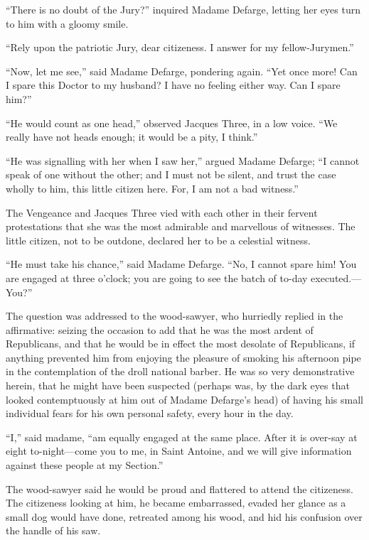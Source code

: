 ``There is no doubt of the Jury?'' inquired Madame Defarge, letting her
eyes turn to him with a gloomy smile.

``Rely upon the patriotic Jury, dear citizeness.  I answer for my
fellow-Jurymen.''

``Now, let me see,'' said Madame Defarge, pondering again.  ``Yet once more!
Can I spare this Doctor to my husband?  I have no feeling either way.
Can I spare him?''

``He would count as one head,'' observed Jacques Three, in a low voice.
``We really have not heads enough; it would be a pity, I think.''

``He was signalling with her when I saw her,'' argued Madame Defarge;
``I cannot speak of one without the other; and I must not be silent,
and trust the case wholly to him, this little citizen here.
For, I am not a bad witness.''

The Vengeance and Jacques Three vied with each other in their fervent
protestations that she was the most admirable and marvellous of
witnesses.  The little citizen, not to be outdone, declared her to be
a celestial witness.

``He must take his chance,'' said Madame Defarge.  ``No, I cannot spare
him!  You are engaged at three o'clock; you are going to see the batch
of to-day executed.---You?''

The question was addressed to the wood-sawyer, who hurriedly replied
in the affirmative:  seizing the occasion to add that he was the most
ardent of Republicans, and that he would be in effect the most
desolate of Republicans, if anything prevented him from enjoying the
pleasure of smoking his afternoon pipe in the contemplation of the
droll national barber.  He was so very demonstrative herein, that he
might have been suspected (perhaps was, by the dark eyes that looked
contemptuously at him out of Madame Defarge's head) of having his small
individual fears for his own personal safety, every hour in the day.

``I,'' said madame, ``am equally engaged at the same place.  After it is
over-say at eight to-night---come you to me, in Saint Antoine, and we
will give information against these people at my Section.''

The wood-sawyer said he would be proud and flattered to attend the
citizeness.  The citizeness looking at him, he became embarrassed,
evaded her glance as a small dog would have done, retreated among
his wood, and hid his confusion over the handle of his saw.

